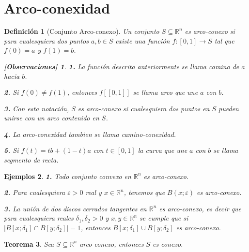 \documentclass[oneside]{book} %
\theoremstyle{Teorema}
\newtheorem{Definicion}{Definición}[chapter]
\newtheorem{Teorema}[Definicion]{Teorema}
\theoremstyle{Ejemplos}
\newtheorem{Ejemplos}[Definicion]{Ejemplos}
\theoremstyle{[Obs]}
\newtheorem*{Obs}{[Observaciones]}
\newcommand{\abs}[1]{\left|#1\right|} %
\renewcommand{\{}{\left\lbrace} %
\renewcommand{\}}{\right\rbrace} %
\renewcommand{\u}{\cup} %
\newcommand{\n}{\cap} %
\renewcommand{\sc}{\subseteq} %
\newcommand{\Rn}{\mathbb{R}^n} %
\begin{document}
		\section{Arco-conexidad}

			\begin{Definicion}[Conjunto Arco-conexo]\setlength{\parindent}{0em}
				
				Un conjunto $S \sc \Rn$ es arco-conexo si para cualesquiera dos puntos $a, b \in S$ existe una función $f : [0, 1] \to S$ tal que $f(0) = a$ y $f(1) = b$. 

				\begin{Obs}
				
					\textbf{1.} La función descrita anteriormente se llama camino de $a$ hacia $b$. 

					\textbf{2.} Si $f(0) \neq f(1)$, entonces $f[[0,1]]$ se llama arco que une $a$ con $b$. 

					\textbf{3.} Con esta notación, $S$ es arco-conexo si cualesquiera dos puntos en $S$ pueden unirse con un arco contenido en $S$. 

					\textbf{4.} La arco-conexidad tambien se llama camino-conexidad. 

					\textbf{5.} Si $f(t) = tb + (1 - t)a$ con $t \in [0, 1]$ la curva que une $a$ con $b$ se llama segmento de recta. 
				
				\end{Obs}

			\end{Definicion}

			\begin{Ejemplos}\setlength{\parindent}{0em}
				
				\textbf{1.} Todo conjunto convexo en $\Rn$ es arco-conexo. 

				\textbf{2.} Para cualesquiera $\varepsilon > 0$ real y $x \in \Rn$, tenemos que $B(x;\varepsilon)$ es arco-conexo. 

				\textbf{3.} La unión de dos discos cerrados tangentes en $\Rn$ es arco-conexo, es decir que para cualesquiera reales $\delta_1, \delta_2 > 0$ y $x, y \in \Rn$ se cumple que si $\abs{B[x;\delta_1] \n B[y;\delta_2]} = 1$, entonces $B[x;\delta_1] \u B[y;\delta_2]$ es arco-conexo. 
	
			\end{Ejemplos}

			\begin{Teorema}\setlength{\parindent}{0em}
				
				Sea $S \sc \Rn$ arco-conexo, entonces $S$ es conexo. 

			\end{Teorema}
\end{document}
